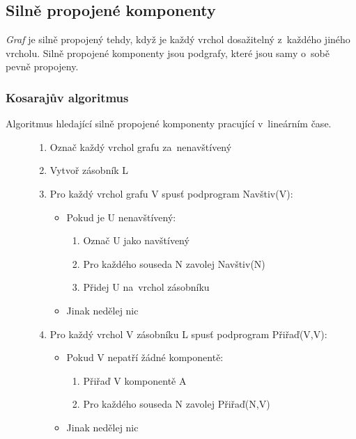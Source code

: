 \subsection{Silně propojené komponenty}

\emph{Graf} je silně propojený tehdy, když je každý vrchol dosažitelný z~každého jiného vrcholu.
Silně propojené komponenty jsou podgrafy, které jsou samy o~sobě pevně propojeny.

\subsubsection{Kosarajův algoritmus}

Algoritmus hledající silně propojené komponenty pracující v~lineárním čase.

\begin{figure}[ht]
\onehalfspacing
\begin{enumerate}
\item Označ každý vrchol grafu za~nenavštívený
\item Vytvoř zásobník L
\item Pro každý vrchol grafu V spusť podprogram Navštiv(V):
    \begin{itemize}
    \item Pokud je U nenavštívený:
        \begin{enumerate}
        \item Označ U jako navštívený
        \item Pro každého souseda N zavolej Navštiv(N)
        \item Přidej U na~vrchol zásobníku
        \end{enumerate}
    \item Jinak nedělej nic
    \end{itemize}
\item Pro každý vrchol V zásobníku L spusť podprogram Přiřaď(V,V):
    \begin{itemize}
    \item Pokud V nepatří žádné komponentě:
        \begin{enumerate}
        \item Přiřaď V komponentě A
        \item Pro každého souseda N zavolej Přiřaď(N,V)
        \end{enumerate}
    \item Jinak nedělej nic
    \end{itemize}
\end{enumerate}
\end{figure}
\FloatBarrier

